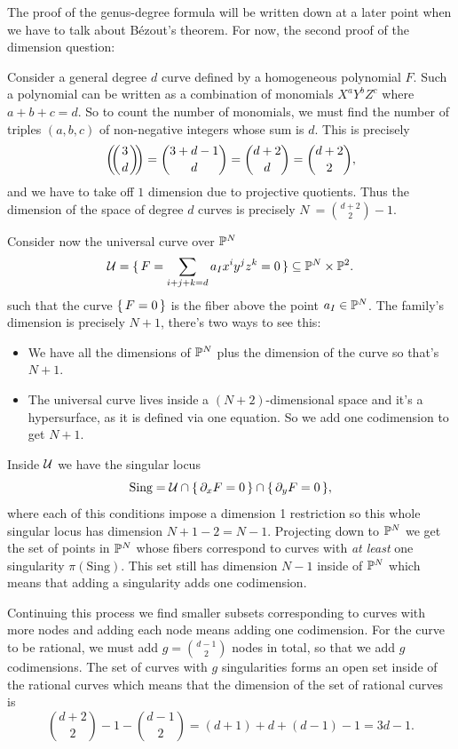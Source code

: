 \documentclass[12pt]{memoir}
\begin{document}
The proof of the genus-degree formula will be written down at a later point when we have to talk about Bézout's theorem. For now, the second proof of the dimension question:

\begin{ptcbp}
    Consider a general degree $d$ curve defined by a homogeneous polynomial $F$. Such a polynomial can be written as a combination of monomials $X^{a}Y^{b}Z^{c}$ where $a+b+c=d$. So to count the number of monomials, we must find the number of triples $(a,b,c)$ of non-negative integers whose sum is $d$. This is precisely 
    $$\multinom{3}{d}=\binom{3+d-1}{d}=\binom{d+2}{d}=\binom{d+2}{2},$$
    and we have to take off $1$ dimension due to projective quotients. Thus the dimension of the space of degree $d$ curves is precisely $N\:=\binom{d+2}{2}-1$.\par 
    Consider now the universal curve over $\mathbb{P}^N$
    $$\mathcal{U}=\{\,F=\sum_{i+j+k=d}a_Ix^iy^jz^k=0\,\}\subseteq\mathbb{P}^N\times\mathbb{P}^2.$$
    such that the curve $\{\,F=0\,\}$ is the fiber above the point $a_I\in\mathbb{P}^N$. The family's dimension is precisely $N+1$, there's two ways to see this:
    \begin{itemize}
        \item We have all the dimensions of $\mathbb{P}^N$ plus the dimension of the curve so that's $N+1$.
        \item The universal curve lives inside a $(N+2)$-dimensional space and it's a hypersurface, as it is defined via one equation. So we add one codimension to get $N+1$.
    \end{itemize}
    Inside $\mathcal{U}$ we have the singular locus
    $$\text{Sing}=\mathcal{U}\cap\{\,\partial_xF=0\,\}\cap\{\,\partial_yF=0\,\},$$
    where each of this conditions impose a dimension 1 restriction so this whole singular locus has dimension $N+1-2=N-1$. Projecting down to $\mathbb{P}^N$ we get the set of points in $\mathbb{P}^N$ whose fibers correspond to curves with \emph{at least} one singularity $\pi(\text{Sing})$. This set still has dimension $N-1$ inside of $\mathbb{P}^N$ which means that adding a singularity adds one codimension.\par 
    Continuing this process we find smaller subsets corresponding to curves with more nodes and adding each node means adding one codimension. For the curve to be rational, we must add $g=\binom{d-1}{2}$ nodes in total, so that we add $g$ codimensions. The set of curves with $g$ singularities forms an open set inside of the rational curves which means that the dimension of the set of rational curves is
    $$\binom{d+2}{2}-1-\binom{d-1}{2}=(d+1)+d+(d-1)-1=3d-1.$$
\end{ptcbp}
\end{document}
